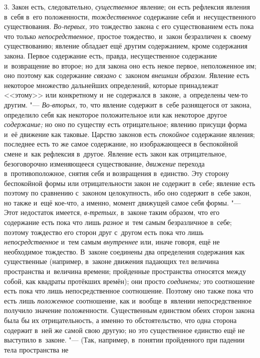 3. Закон есть, следовательно, {\em существенное}
явление; он есть рефлексия явления в~себя в~его положенности,
{\em тождественное} содержание себя и~несущественного
существования. {\em Во-первых,} это тождество закона с
его существованием есть пока что только
{\em непосредственное,} простое тождество, и~закон
безразличен к~своему существованию; явление обладает ещё другим
содержанием, кроме содержания закона. Первое содержание есть, правда,
несущественное содержание и~возвращение во второе; но для закона оно есть
некое первое, неположенное им; оно поэтому как содержание
{\em связано} с~законом
{\em внешним образом}. Явление есть некоторое множество
дальнейших определений, которые принадлежат <<этому>> или конкретному и~не
содержался в~законе, а~определены чем-то другим. "---
{\em Во-вторых,} то, что явление содержит в~себе
разнящегося от закона, определило себя как некоторое положительное или как
некоторое другое {\em содержание;} но оно по существу
есть отрицательное; явлению присущи форма и~её движение как таковые.
Царство законов есть {\em спокойное} содержание
явления; последнее есть то же самое содержание, но изображающееся в
беспокойной смене и~как рефлексия в~другое. Явление есть закон как
отрицательное, безоговорочно изменяющееся существование,
{\em движение} перехода в~противоположное, снятия себя
и возвращения в~единство. Эту сторону беспокойной формы или отрицательности
закон не содержит в~себе; явление есть поэтому по сравнению с~законом
целокупность, ибо оно содержит в~себе закон, но также и~ещё кое-что, а
именно, момент движущей самое себя формы. "--- Этот недостаток имеется,
{\em в-третьих,} в~законе таким образом, что его
содержание есть пока что лишь {\em разное} и~тем самым
безразличное в~себе; поэтому тождество его сторон друг с~другом есть пока
что лишь {\em непосредственное} и~тем самым
{\em внутреннее} или, иначе говоря, ещё не необходимое
тождество. В~законе соединены два определения содержания как существенные
(например, в~законе движения падающих тел величина пространства и~величина
времени; пройденные пространства относятся между собой, как квадраты
протёкших времён); они просто {\em соединены;} это
соотношение есть пока что лишь непосредственное соотношение. Поэтому оно
также пока что есть лишь {\em положенное} соотношение,
как и~вообще в~явлении непосредственное получило значение положенности.
Существенным единством обеих сторон закона была бы их отрицательность, а
именно то обстоятельство, что одна сторона содержит в~ней же самой свою
другую; но это существенное единство ещё не выступило в~законе. "--- (Так,
например, в~понятии пройденного при падении тела пространства не
